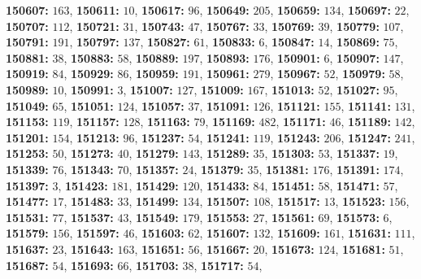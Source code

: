 \textsf{\bfseries 150607:} $163$, \textsf{\bfseries 150611:} $10$, \textsf{\bfseries 150617:} $96$, \textsf{\bfseries 150649:} $205$, \textsf{\bfseries 150659:} $134$, \textsf{\bfseries 150697:} $22$, \textsf{\bfseries 150707:} $112$, \textsf{\bfseries 150721:} $31$, \textsf{\bfseries 150743:} $47$, \textsf{\bfseries 150767:} $33$, \textsf{\bfseries 150769:} $39$, \textsf{\bfseries 150779:} $107$, \textsf{\bfseries 150791:} $191$, \textsf{\bfseries 150797:} $137$, \textsf{\bfseries 150827:} $61$, \textsf{\bfseries 150833:} $6$, \textsf{\bfseries 150847:} $14$, \textsf{\bfseries 150869:} $75$, \textsf{\bfseries 150881:} $38$, \textsf{\bfseries 150883:} $58$, \textsf{\bfseries 150889:} $197$, \textsf{\bfseries 150893:} $176$, \textsf{\bfseries 150901:} $6$, \textsf{\bfseries 150907:} $147$, \textsf{\bfseries 150919:} $84$, \textsf{\bfseries 150929:} $86$, \textsf{\bfseries 150959:} $191$, \textsf{\bfseries 150961:} $279$, \textsf{\bfseries 150967:} $52$, \textsf{\bfseries 150979:} $58$, \textsf{\bfseries 150989:} $10$, \textsf{\bfseries 150991:} $3$, \textsf{\bfseries 151007:} $127$, \textsf{\bfseries 151009:} $167$, \textsf{\bfseries 151013:} $52$, \textsf{\bfseries 151027:} $95$, \textsf{\bfseries 151049:} $65$, \textsf{\bfseries 151051:} $124$, \textsf{\bfseries 151057:} $37$, \textsf{\bfseries 151091:} $126$, \textsf{\bfseries 151121:} $155$, \textsf{\bfseries 151141:} $131$, \textsf{\bfseries 151153:} $119$, \textsf{\bfseries 151157:} $128$, \textsf{\bfseries 151163:} $79$, \textsf{\bfseries 151169:} $482$, \textsf{\bfseries 151171:} $46$, \textsf{\bfseries 151189:} $142$, \textsf{\bfseries 151201:} $154$, \textsf{\bfseries 151213:} $96$, \textsf{\bfseries 151237:} $54$, \textsf{\bfseries 151241:} $119$, \textsf{\bfseries 151243:} $206$, \textsf{\bfseries 151247:} $241$, \textsf{\bfseries 151253:} $50$, \textsf{\bfseries 151273:} $40$, \textsf{\bfseries 151279:} $143$, \textsf{\bfseries 151289:} $35$, \textsf{\bfseries 151303:} $53$, \textsf{\bfseries 151337:} $19$, \textsf{\bfseries 151339:} $76$, \textsf{\bfseries 151343:} $70$, \textsf{\bfseries 151357:} $24$, \textsf{\bfseries 151379:} $35$, \textsf{\bfseries 151381:} $176$, \textsf{\bfseries 151391:} $174$, \textsf{\bfseries 151397:} $3$, \textsf{\bfseries 151423:} $181$, \textsf{\bfseries 151429:} $120$, \textsf{\bfseries 151433:} $84$, \textsf{\bfseries 151451:} $58$, \textsf{\bfseries 151471:} $57$, \textsf{\bfseries 151477:} $17$, \textsf{\bfseries 151483:} $33$, \textsf{\bfseries 151499:} $134$, \textsf{\bfseries 151507:} $108$, \textsf{\bfseries 151517:} $13$, \textsf{\bfseries 151523:} $156$, \textsf{\bfseries 151531:} $77$, \textsf{\bfseries 151537:} $43$, \textsf{\bfseries 151549:} $179$, \textsf{\bfseries 151553:} $27$, \textsf{\bfseries 151561:} $69$, \textsf{\bfseries 151573:} $6$, \textsf{\bfseries 151579:} $156$, \textsf{\bfseries 151597:} $46$, \textsf{\bfseries 151603:} $62$, \textsf{\bfseries 151607:} $132$, \textsf{\bfseries 151609:} $161$, \textsf{\bfseries 151631:} $111$, \textsf{\bfseries 151637:} $23$, \textsf{\bfseries 151643:} $163$, \textsf{\bfseries 151651:} $56$, \textsf{\bfseries 151667:} $20$, \textsf{\bfseries 151673:} $124$, \textsf{\bfseries 151681:} $51$, \textsf{\bfseries 151687:} $54$, \textsf{\bfseries 151693:} $66$, \textsf{\bfseries 151703:} $38$, \textsf{\bfseries 151717:} $54$, 
